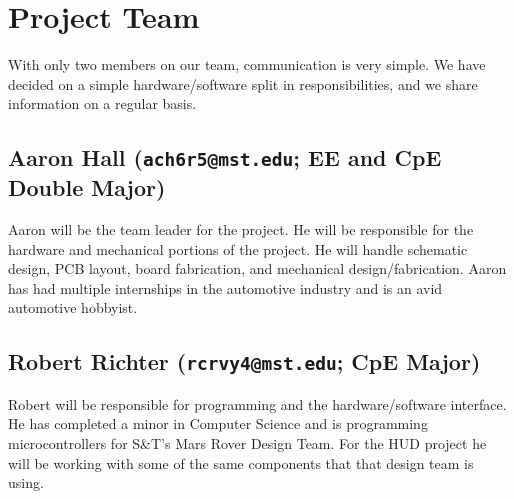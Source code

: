 \section{Project Team}

With only two members on our team, communication is very simple. We have
decided on a simple hardware/software split in responsibilities, and we
share information on a regular basis.

\subsection{Aaron Hall (\texttt{ach6r5@mst.edu}; EE and CpE Double Major)}

Aaron will be the team leader for the project. He will be responsible for
the hardware and mechanical portions of the project. He will handle
schematic design, PCB layout, board fabrication, and mechanical
design/fabrication. Aaron has had multiple internships in the automotive
industry and is an avid automotive hobbyist.

\subsection{Robert Richter (\texttt{rcrvy4@mst.edu}; CpE Major)}

Robert will be responsible for programming and the hardware/software
interface. He has completed a minor in Computer Science and is programming
microcontrollers for S\&T's Mars Rover Design Team. For the HUD project he
will be working with some of the same components that that design team is
using.